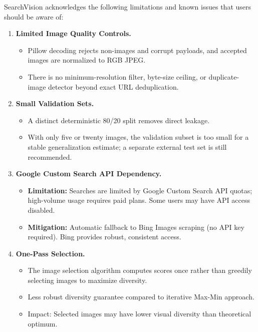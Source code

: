 \documentclass[12pt, letterpaper]{article}
\begin{document}
SearchVision acknowledges the following limitations and known issues that users should be aware of:

\begin{enumerate}
  \item \textbf{Limited Image Quality Controls.}
    \begin{itemize}
      \item Pillow decoding rejects non-images and corrupt payloads, and accepted images
        are normalized to RGB JPEG.
      \item There is no minimum-resolution filter, byte-size ceiling, or duplicate-image
        detector beyond exact URL deduplication.
    \end{itemize}
  
  \item \textbf{Small Validation Sets.}
    \begin{itemize}
      \item A distinct deterministic 80/20 split removes direct leakage.
      \item With only five or twenty images, the validation subset is too small for a
        stable generalization estimate; a separate external test set is still recommended.
    \end{itemize}
  
  \item \textbf{Google Custom Search API Dependency.} 
    \begin{itemize}
      \item \textbf{Limitation:} Searches are limited by Google Custom Search API quotas; 
        high-volume usage requires paid plans. Some users may have API access disabled.
      \item \textbf{Mitigation:} Automatic fallback to Bing Images scraping (no API key required). 
        Bing provides robust, consistent access.
    \end{itemize}
  
  \item \textbf{One-Pass Selection.} 
    \begin{itemize}
      \item The image selection algorithm computes scores once rather than greedily selecting 
        images to maximize diversity.
      \item Less robust diversity guarantee compared to iterative Max-Min approach.
      \item Impact: Selected images may have lower visual diversity than theoretical optimum.
    \end{itemize}
  

\end{enumerate}
\end{document}
